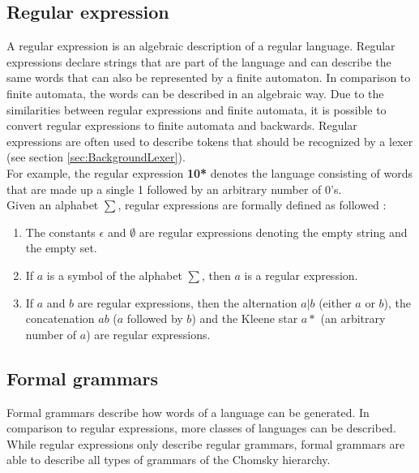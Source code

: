 \subsection{Regular expression}\label{sec:BackgroundRegEx}

A regular expression is an algebraic description of a regular language.
Regular expressions declare strings that are part of the language and can describe the same words that can also be represented by a finite automaton. 
In comparison to finite automata, the words can be described in an algebraic way. 
Due to the similarities between regular expressions and finite automata, it is possible to convert regular expressions to finite automata and backwards. 
Regular expressions are often used to describe tokens that should be recognized by a lexer (see section \ref{sec:BackgroundLexer}). \cite{AutomataTheory.2007}\\
For example, the regular expression \textbf{10*} denotes the language consisting of words that are made up a single 1 followed by an arbitrary number of 0's.\\
Given an alphabet $\sum$, regular expressions are formally defined as followed \cite{AutomataTheory.2007}:
\begin{enumerate}
\item The constants $\epsilon$ and $\emptyset$ are regular expressions denoting the empty string and the empty set.
\item If $a$ is a symbol of the alphabet $\sum$, then $a$ is a regular expression.
\item If $a$ and $b$ are regular expressions, then the alternation $a|b$ (either $a$ or $b$), the concatenation $ab$ ($a$ followed by $b$) and the Kleene star $a*$ (an arbitrary number of $a$) are regular expressions.
\end{enumerate}


\subsection{Formal grammars}\label{sec:BackgroundGrammar}

Formal grammars describe how words of a language can be generated. In comparison to regular expressions, more classes of languages can be described. While regular expressions only describe regular grammars, formal grammars are able to describe all types of grammars of the Chomsky hierarchy.



